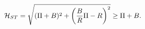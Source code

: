 \begin{equation}
\label{ST2}
{\cal H}_{ST} = 
\sqrt{(\Pi + B)^2 + \left( \frac{B}{R} \Pi - R \right)^2}
\geq \Pi + B.
\end{equation} 
